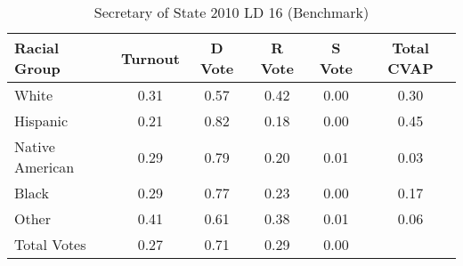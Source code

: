 \begin{table}[htb]
\begin{center}
\caption{Secretary of State 2010 LD 16 (Benchmark)}
\label{sos10_cvap_ld_16_benchmark}
\begin{tabular}{lccccc}
  \hline
Racial Group & Turnout & D Vote & R Vote & S Vote & Total CVAP \\ 
  \hline
White & 0.31 & 0.57 & 0.42 & 0.00 & 0.30 \\ 
  Hispanic & 0.21 & 0.82 & 0.18 & 0.00 & 0.45 \\ 
  Native American & 0.29 & 0.79 & 0.20 & 0.01 & 0.03 \\ 
  Black & 0.29 & 0.77 & 0.23 & 0.00 & 0.17 \\ 
  Other & 0.41 & 0.61 & 0.38 & 0.01 & 0.06 \\ 
  Total Votes & 0.27 & 0.71 & 0.29 & 0.00 &  \\ 
   \hline
\end{tabular}
\end{center}
\end{table}

